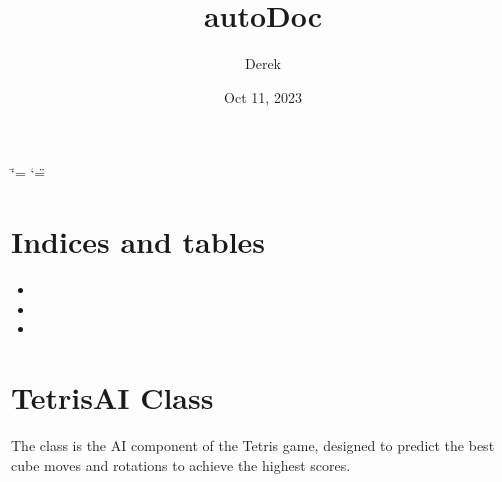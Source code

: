 \documentclass[letterpaper,10pt,english]{sphinxmanual}
\title{autoDoc}
\date{Oct 11, 2023}
\author{Derek}
\begin{document}
\ifdefined\shorthandoff
  \ifnum\catcode`\=\string=\active\shorthandoff{=}\fi
  \ifnum\catcode`\"=\active{}\fi
\fi

\pagestyle{empty}
\sphinxmaketitle
\pagestyle{plain}
\sphinxtableofcontents
\pagestyle{normal}
\label{\detokenize{index::doc}}



\chapter{Indices and tables}
\label{\detokenize{index:indices-and-tables}}\begin{itemize}
\item {} 
\sphinxAtStartPar
{}

\item {} 
\sphinxAtStartPar
{}

\item {} 
\sphinxAtStartPar
{}

\end{itemize}


\chapter{TetrisAI Class}
\label{\detokenize{index:tetrisai-class}}
\sphinxAtStartPar
The  class is the AI component of the Tetris game, designed to predict the best cube moves and rotations to achieve the highest scores.
\end{document}
